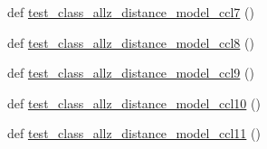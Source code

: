 \begin{DoxyCompactItemize}
\item 
def \mbox{\hyperlink{namespaceccl__test__distances_afd01c8b5942ca3a72ec88924c2bc2bde}{test\+\_\+class\+\_\+allz\+\_\+distance\+\_\+model\+\_\+ccl7}} ()
\item 
def \mbox{\hyperlink{namespaceccl__test__distances_a8a1ab66bfcbfd819505ede99df81804a}{test\+\_\+class\+\_\+allz\+\_\+distance\+\_\+model\+\_\+ccl8}} ()
\item 
def \mbox{\hyperlink{namespaceccl__test__distances_ab6014e7327e5c54cf2e19263dd500d6f}{test\+\_\+class\+\_\+allz\+\_\+distance\+\_\+model\+\_\+ccl9}} ()
\item 
def \mbox{\hyperlink{namespaceccl__test__distances_a9b36b386e9e7e84edb37c190f7283b91}{test\+\_\+class\+\_\+allz\+\_\+distance\+\_\+model\+\_\+ccl10}} ()
\item 
def \mbox{\hyperlink{namespaceccl__test__distances_a2c82ae2e094cf68f1543e3e8f1c4af9d}{test\+\_\+class\+\_\+allz\+\_\+distance\+\_\+model\+\_\+ccl11}} ()
\end{DoxyCompactItemize}

